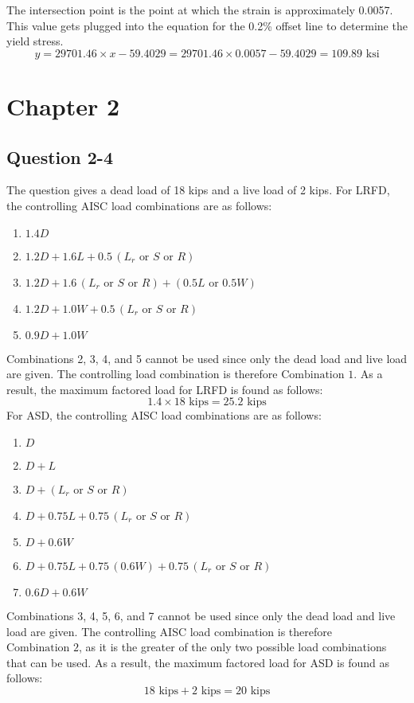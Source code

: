 \documentclass{article}
\begin{document}
    The intersection point is the point at which the strain is approximately 0.0057. This value gets plugged into the equation for the 0.2\% offset line to determine the yield stress.
    \[y=29701.46\times x-59.4029=29701.46\times0.0057-59.4029=\boxed{109.89\text{ ksi}}\]
    \newpage
    \section*{Chapter 2}
    \subsection*{Question 2-4} 
    \noindent The question gives a dead load of 18 kips and a live load of 2 kips. For LRFD, the controlling AISC load combinations are as follows:
    \begin{enumerate}
        \item \(1.4D\) 
        \item \(1.2D+1.6L+0.5\,(L_r\text{ or }S\text{ or }R)\)
        \item \(1.2D+1.6\,(L_r\text{ or }S\text{ or }R)+(0.5L\text{ or }0.5W)\)
        \item \(1.2D+1.0W+0.5\,(L_r\text{ or }S\text{ or }R)\)
        \item \(0.9D+1.0W\)
    \end{enumerate}
    Combinations 2, 3, 4, and 5 cannot be used since only the dead load and live load are given. The controlling load combination is therefore \(\boxed{\text{Combination 1}}\). As a result, the maximum factored load for LRFD is found as follows:
    \[1.4\times 18\text{ kips}=\boxed{25.2\text{ kips}}\] 
    \noindent For ASD, the controlling AISC load combinations are as follows: 
    \begin{enumerate}
        \item \(D\) 
        \item \(D+L\)
        \item \(D+(L_r\text{ or }S\text{ or }R)\)
        \item \(D+0.75L+0.75\,(L_r\text{ or }S\text{ or }R)\)
        \item \(D+0.6W\)
        \item \(D+0.75L+0.75\,(0.6W)+0.75\,(L_r\text{ or }S\text{ or }R)\) 
        \item \(0.6D+0.6W\)
    \end{enumerate}
    \noindent Combinations 3, 4, 5, 6, and 7 cannot be used since only the dead load and live load are given. The controlling AISC load combination is therefore \(\boxed{\text{Combination 2}}\), as it is the greater of the only two possible load combinations that can be used. As a result, the maximum factored load for ASD is found as follows: 
    \[18\text{ kips}+2\text{ kips}=\boxed{20\text{ kips}}\]
    \newpage 
\end{document}
